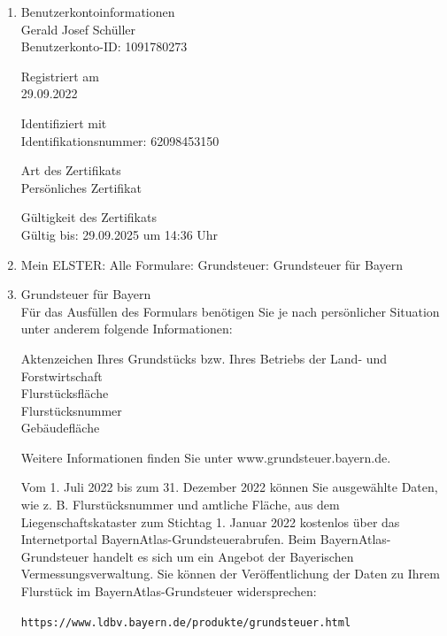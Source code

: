 \documentclass[10pt,a4paper]{article}
\begin{document}
\begin{enumerate}[label={\Square}]
  \item [\XBox] Benutzerkontoinformationen \\
      Gerald Josef Schüller \\
      Benutzerkonto-ID: 1091780273

      \vskip 4pt
      Registriert am \\
      29.09.2022

      \vskip 4pt
      Identifiziert mit \\
      Identifikationsnummer: 62098453150
      
      \vskip 4pt
      Art des Zertifikats \\
      Persönliches Zertifikat 

      \vskip 4pt
      Gültigkeit des Zertifikats \\
      Gültig bis: 29.09.2025 um 14:36 Uhr

    \item [\XBox] Mein ELSTER: Alle Formulare: Grundsteuer: Grundsteuer für Bayern

    \item Grundsteuer für Bayern \\
      Für das Ausfüllen des Formulars benötigen Sie je nach persönlicher
      Situation unter anderem folgende Informationen:

      \vskip 4pt
      Aktenzeichen Ihres Grundstücks bzw. Ihres Betriebs der Land- und Forstwirtschaft \\
      Flurstücksfläche \\
      Flurstücksnummer \\
      Gebäudefläche

      \vskip 4pt
      Weitere Informationen finden Sie unter www.grundsteuer.bayern.de.

      \vskip 4pt
      Vom 1. Juli 2022 bis zum 31. Dezember 2022 können Sie ausgewählte Daten,
      wie z. B. Flurstücksnummer und amtliche Fläche, aus dem
      Liegenschaftskataster zum Stichtag 1. Januar 2022 kostenlos über das
      Internetportal BayernAtlas-Grundsteuerabrufen. Beim BayernAtlas-Grundsteuer
      handelt es sich um ein Angebot der Bayerischen Vermessungsverwaltung. Sie
      können der Veröffentlichung der Daten zu Ihrem Flurstück im
      BayernAtlas-Grund\-steuer widersprechen:
      
      \vskip 4pt
      \verb+https://www.ldbv.bayern.de/produkte/grundsteuer.html+

\end{enumerate}
\end{document}
